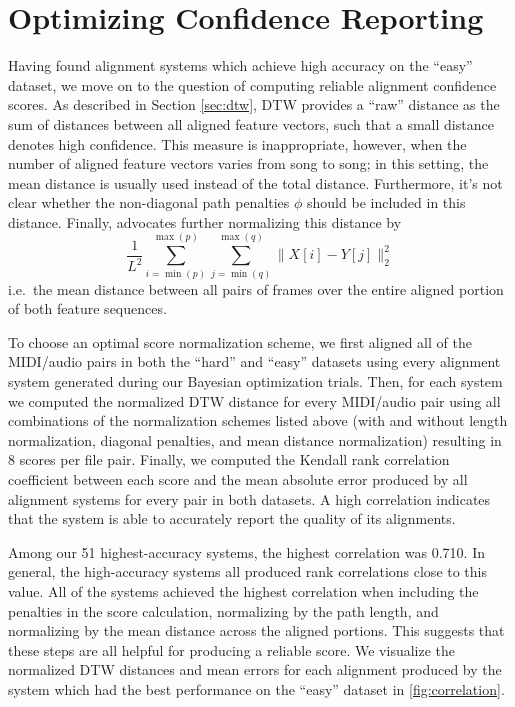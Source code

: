 \section{Optimizing Confidence Reporting}
\label{sec:confidence}

Having found alignment systems which achieve high accuracy on the ``easy'' dataset, we move on to the question of computing reliable alignment confidence scores.
As described in Section \ref{sec:dtw}, DTW provides a ``raw'' distance as the sum of distances between all aligned feature vectors, such that a small distance denotes high confidence.
This measure is inappropriate, however, when the number of aligned feature vectors varies from song to song; in this setting, the mean distance is usually used instead of the total distance.
Furthermore, it's not clear whether the non-diagonal path penalties $\phi$ should be included in this distance.
Finally, \cite{raffel2015large} advocates further normalizing this distance by
$$
\frac{1}{L^2} \sum_{i = \min(p)}^{\max(p)} \sum_{j = \min(q)}^{\max(q)} \|X[i] - Y[j]\|_2^2
$$
i.e.\ the mean distance between all pairs of frames over the entire aligned portion of both feature sequences.

To choose an optimal score normalization scheme, we first aligned all of the MIDI/audio pairs in both the ``hard'' and ``easy'' datasets using every alignment system generated during our Bayesian optimization trials.
Then, for each system we computed the normalized DTW distance for every MIDI/audio pair using all combinations of the normalization schemes listed above (with and without length normalization, diagonal penalties, and mean distance normalization) resulting in 8 scores per file pair.
Finally, we computed the Kendall rank correlation coefficient \cite{kendall1938new} between each score and the mean absolute error produced by all alignment systems for every pair in both datasets.
A high correlation indicates that the system is able to accurately report the quality of its alignments.

Among our 51 highest-accuracy systems, the highest correlation was 0.710.
In general, the high-accuracy systems all produced rank correlations close to this value.
All of the systems achieved the highest correlation when including the penalties in the score calculation, normalizing by the path length, and normalizing by the mean distance across the aligned portions.
This suggests that these steps are all helpful for producing a reliable score.
We visualize the normalized DTW distances and mean errors for each alignment produced by the system which had the best performance on the ``easy'' dataset in \cref{fig:correlation}.

